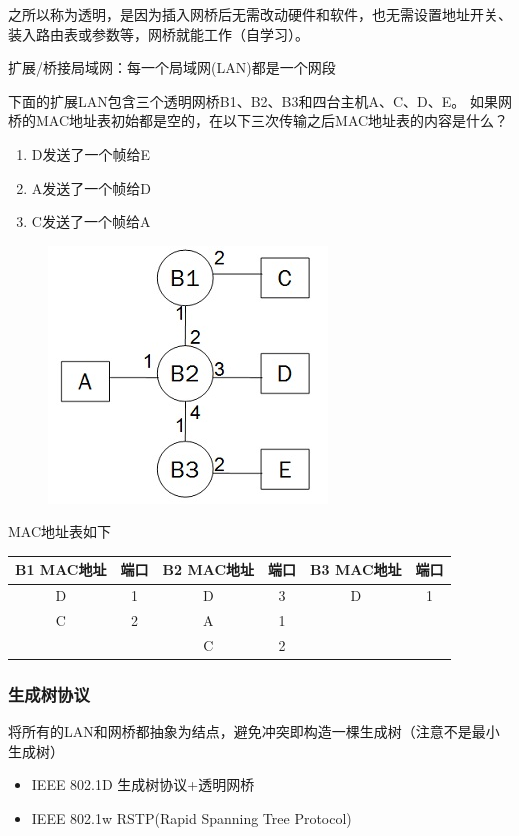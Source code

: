 之所以称为透明，是因为插入网桥后无需改动硬件和软件，也无需设置地址开关、装入路由表或参数等，网桥就能工作（自学习）。

\myhline
扩展/桥接局域网：每一个局域网(LAN)都是一个网段
\begin{example}
	下面的扩展LAN包含三个透明网桥B1、B2、B3和四台主机A、C、D、E。
	如果网桥的MAC地址表初始都是空的，在以下三次传输之后MAC地址表的内容是什么？
	\begin{enumerate}
	\item D发送了一个帧给E
	\item A发送了一个帧给D
	\item C发送了一个帧给A
	\end{enumerate}
	\begin{figure}[H]
		\centering
		\includegraphics[width=0.25\linewidth]{fig/mac_address.jpg}
	\end{figure}
\end{example}
\begin{analysis}
	MAC地址表如下
	\begin{center}
		\begin{tabular}{cc|cc|cc}\hline
			B1 MAC地址 & 端口 & B2 MAC地址 & 端口 & B3 MAC地址 & 端口\\\hline
			D & 1 & D & 3 & D & 1\\
			C & 2 & A & 1 & & \\
			& & C & 2 & & \\\hline
		\end{tabular}
	\end{center}
\end{analysis}

\subsubsection{生成树协议}
将所有的LAN和网桥都抽象为结点，避免冲突即构造一棵生成树（注意不是最小生成树）
\begin{itemize}
\item IEEE 802.1D 生成树协议+透明网桥
\item IEEE 802.1w RSTP(Rapid Spanning Tree Protocol)
\end{itemize}

